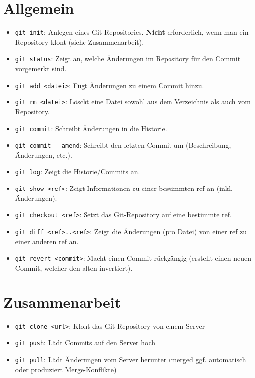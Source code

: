 \documentclass[accentcolor=tud8b,colorbacktitle,12pt]{tudexercise}
\begin{document}
\section*{Allgemein}
\begin{itemize}
	\item \lstinline|git init|: Anlegen eines Git-Repositories. \textbf{Nicht} erforderlich, wenn man ein Repository klont (siehe Zusammenarbeit).
	\item \lstinline|git status|: Zeigt an, welche Änderungen im Repository für den Commit vorgemerkt sind.
	\item \lstinline|git add <datei>|: Fügt Änderungen zu einem Commit hinzu.
	\item \lstinline|git rm <datei>|: Löscht eine Datei sowohl aus dem Verzeichnis als auch vom Repository.
	\item \lstinline|git commit|: Schreibt Änderungen in die Historie.
	\item \lstinline|git commit --amend|: Schreibt den letzten Commit um (Beschreibung, Änderungen, etc.).
	\item \lstinline|git log|: Zeigt die Historie/Commits an.
	\item \lstinline|git show <ref>|: Zeigt Informationen zu einer bestimmten ref an (inkl. Änderungen).
	\item \lstinline|git checkout <ref>|: Setzt das Git-Repository auf eine bestimmte ref.
	\item \lstinline|git diff <ref>..<ref>|: Zeigt die Änderungen (pro Datei) von einer ref zu einer anderen ref an.
	\item \lstinline|git revert <commit>|: Macht einen Commit rückgängig (erstellt einen neuen Commit, welcher den alten invertiert).
\end{itemize}

\section*{Zusammenarbeit}
\begin{itemize}
	\label{CollabClone}
	\item \lstinline|git clone <url>|: Klont das Git-Repository von einem Server
	\item \lstinline|git push|: Lädt Commits auf den Server hoch
	\item \lstinline|git pull|: Lädt Änderungen vom Server herunter (merged ggf. automatisch oder produziert Merge-Konflikte)
\end{itemize}
\end{document}
